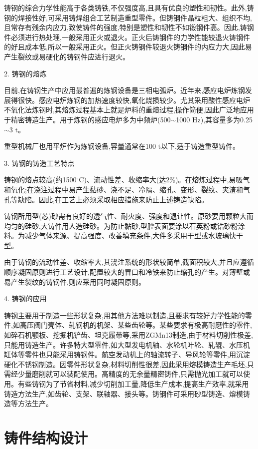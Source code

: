 \documentclass[UTF8]{ctexbook}
\newcommand{\◎}{\ensuremath{\bigcirc}}
\begin{document}
铸钢的综合力学性能高于各类铸铁,不仅强度高,且具有优良的塑性和韧性。此外,铸钢的焊接性好,可采用铸焊组合工艺制造重型零件。但铸钢件晶粒粗大、组织不均,且常存有残余内应力,致使铸件的强度,特别是塑性和韧性不如锻钢件高。因此,铸钢件必须进行热处理,一般采用正火或退火。正火后铸钢件的力学性能较退火铸钢件的好且成本低,所以一般采用正火。但正火铸钢件较退火铸钢件的内应力大,因此易产生裂纹或易硬化的铸钢件应进行退火。

2. 铸钢的熔炼

目前,在铸钢生产中应用最普遍的炼钢设备是三相电弧炉。近年来,感应电炉炼钢发展得很快。感应电炉炼钢的加热速度较快,氧化烧损较少。尤其采用酸性感应电炉不氧化法炼钢时,其熔炼过程基本上就是炉料的重熔过程,操作简便,因此广泛地应用于精密铸造生产。用于炼钢的感应电炉多为中频炉(500$\sim$1000 Hz),其容量多为0.25$\sim$3 t。

重型机械厂也用平炉作为炼钢设备,容量通常在100 t以下,适于铸造重型铸件。

3. 铸钢的铸造工艺特点

铸钢的熔点较高(约1500$^{\circ}$C)、流动性差、收缩率大(达2\%)。在熔炼过程中,易吸气和氧化;在浇注过程中易产生黏砂、浇不足、冷隔、缩孔、变形、裂纹、夹渣和气孔等缺陷。因此,在工艺上必须采取相应措施来防止上述铸造缺陷。

铸钢所用型(芯)砂需有良好的透气性、耐火度、强度和退让性。原砂要用颗粒大而均匀的硅砂,大铸件用人造硅砂。为防止黏砂,型腔表面要涂以石英粉或锆砂粉涂料。为减少气体来源、提高强度、改善填充条件,大件多采用干型或水玻璃快干型。

由于铸钢的流动性差、收缩率大,其浇注系统的形状较简单,截面积较大,并且应遵循顺序凝固原则进行工艺设计,配置较大的冒口和冷铁来防止缩孔的产生。对薄壁或易产生裂纹的铸钢件,则应采用同时凝固原则。

4. 铸钢的应用

铸钢主要用于制造一些形状复杂,用其他方法难以制造,且要求有较好力学性能的零件,如高压阀门壳体、轧钢机的机架、某些齿轮等。某些要求有极高耐磨性的零件,如碎石机颚板、挖掘机铲齿、坦克履带等,采用ZGMn13制造,由于材料切削性极差,只能用铸造生产。许多特大型零件,如大型发电机轴、水轮机叶轮、轧辊、水压机缸体等零件也只能采用铸钢件。航空发动机上的轴流转子、导风轮等零件,用沉淀硬化不锈钢制造。因零件形状复杂,材料切削性很差,因此采用熔模铸造生产毛坯,只需经少量磨削就可以装配使用。高精度的无余量精密铸件,只需抛光加工就可以使用。有些铸钢为了节省材料,减少切削加工量,降低生产成本,提高生产效率,就采用铸造方法生产,如齿轮、支架、联轴器、接头等。铸钢件可采用砂型铸造、熔模铸造等方法生产。

\section{铸件结构设计}
\end{document}
